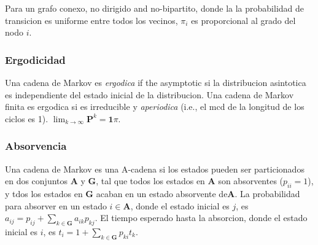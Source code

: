 Para un grafo conexo, no dirigido and no-bipartito, donde la la probabilidad de transicion es uniforme entre todos los vecinos, $\pi_i$ es proporcional al grado del nodo $i$.

\subsubsection{Ergodicidad}
Una cadena de Markov es \emph{ergodica} if the asymptotic si la distribucion asintotica es independiente del estado inicial de la distribucion.
Una cadena de Markov finita es ergodica si es irreducible y \emph{aperiodica} (i.e., el mcd de la longitud de los ciclos es 1).
$\lim_{k\rightarrow\infty}\mathbf{P}^k = \mathbf{1}\pi$.

\subsubsection{Absorvencia}
Una cadena de Markov es una A-cadena si los estados pueden ser particionados en dos conjuntos $\mathbf{A}$ y $\mathbf{G}$, tal que todos los estados en $\mathbf{A}$ son absorventes ($p_{ii}=1$), y tdos los estados en $\mathbf{G}$ acaban en un estado absorvente de$\mathbf{A}$.
La probabilidad para absorver en un estado $i\in\mathbf{A}$, donde el estado inicial es $j$, es $a_{ij} = p_{ij}+\sum_{k\in\mathbf{G}} a_{ik}p_{kj}$.
El tiempo esperado hasta la absorcion, donde el estado inicial es $i$, es $t_i = 1+\sum_{k\in\mathbf{G}}p_{ki}t_k$.
